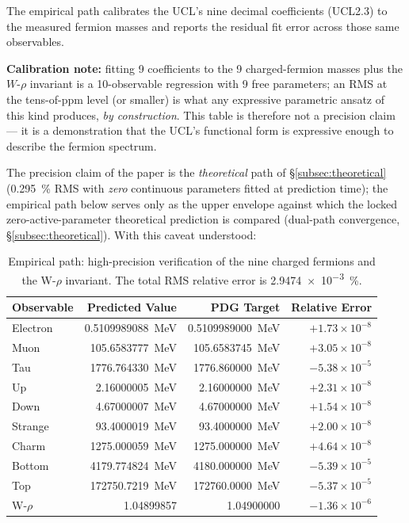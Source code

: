 \documentclass[11pt]{article}
\theoremstyle{remark}
\begin{document}
The empirical path calibrates the UCL's nine decimal coefficients (UCL2.3) to the measured fermion masses and reports the residual fit error across those same observables.

\smallskip
\textbf{Calibration note:} fitting 9 coefficients to the 9 charged-fermion masses plus the $W$-$\rho$ invariant is a 10-observable regression with 9 free parameters; an RMS at the tens-of-ppm level (or smaller) is what any expressive parametric ansatz of this kind produces, \emph{by construction}.  This table is therefore not a precision claim --- it is a demonstration that the UCL's functional form is expressive enough to describe the fermion spectrum.

\smallskip
The precision claim of the paper is the \emph{theoretical} path of \S\ref{subsec:theoretical} (\SI{0.295}{\percent} RMS with \emph{zero} continuous parameters fitted at prediction time); the empirical path below serves only as the upper envelope against which the locked zero-active-parameter theoretical prediction is compared (dual-path convergence, \S\ref{subsec:theoretical}).  With this caveat understood:

\begin{table}[t]
\centering
\caption{Empirical path: high-precision verification of the nine charged fermions and the W-$\rho$ invariant. The total RMS relative error is \SI{2.9474e-3}{\percent}.}
\label{tab:empirical_primary}
\renewcommand{\arraystretch}{1.08}
\setlength{\tabcolsep}{5.5pt}
\begin{tabular}{@{}l r r r@{}}
\toprule
\textbf{Observable} & \textbf{Predicted Value} & \textbf{PDG Target} & \textbf{Relative Error} \\
\midrule
Electron & \SI{0.5109989088}{MeV} & \SI{0.5109989000}{MeV} & $+1.73 \times 10^{-8}$ \\
Muon     & \SI{105.6583777}{MeV}  & \SI{105.6583745}{MeV}  & $+3.05 \times 10^{-8}$ \\
Tau      & \SI{1776.764330}{MeV}  & \SI{1776.860000}{MeV}  & $-5.38 \times 10^{-5}$ \\
Up       & \SI{2.16000005}{MeV}   & \SI{2.16000000}{MeV}   & $+2.31 \times 10^{-8}$ \\
Down     & \SI{4.67000007}{MeV}   & \SI{4.67000000}{MeV}   & $+1.54 \times 10^{-8}$ \\
Strange  & \SI{93.4000019}{MeV}   & \SI{93.4000000}{MeV}   & $+2.00 \times 10^{-8}$ \\
Charm    & \SI{1275.000059}{MeV}  & \SI{1275.000000}{MeV}  & $+4.64 \times 10^{-8}$ \\
Bottom   & \SI{4179.774824}{MeV}  & \SI{4180.000000}{MeV}  & $-5.39 \times 10^{-5}$ \\
Top      & \SI{172750.7219}{MeV}  & \SI{172760.0000}{MeV}  & $-5.37 \times 10^{-5}$ \\
W-$\rho$ & 1.04899857             & 1.04900000             & $-1.36 \times 10^{-6}$ \\
\bottomrule
\end{tabular}
\end{table}
\end{document}
